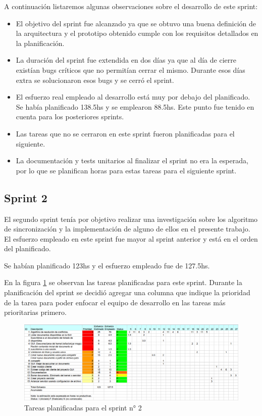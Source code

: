 \documentclass[12pt,a4paper]{article}
\begin{document}
A continuación listaremos algunas observaciones sobre el desarrollo de este sprint:

\begin{itemize}
\item El objetivo del sprint fue alcanzado ya que se obtuvo una buena definición de la arquitectura y el prototipo
obtenido cumple con los requisitos detallados en la planificación.
\item La duración del sprint fue extendida en dos días ya que al día de cierre existían bugs críticos que no permitían
cerrar el mismo. Durante esos días extra se solucionaron esos bugs y se cerró el sprint.
\item El esfuerzo real empleado al desarrollo está muy por debajo del planificado. Se había planificado 138.5hs y se
emplearon 88.5hs. Este punto fue tenido en cuenta para los posteriores sprints.
\item Las tareas que no se cerraron en este sprint fueron planificadas para el siguiente.
\item La documentación y tests unitarios al finalizar el sprint no era la esperada, por lo que se planifican
horas para estas tareas para el siguiente sprint.
\end{itemize}

\subsection{Sprint 2}

El segundo sprint tenía por objetivo realizar una investigación sobre los algoritmo de sincronización y la implementación
de alguno de ellos en el presente trabajo. El esfuerzo empleado en este sprint fue mayor al sprint anterior y está
en el orden del planificado.

Se habían planificado 123hs y el esfuerzo empleado fue de 127.5hs.

En la figura \ref{sprint2-tareas} se observan las tareas planificadas para este sprint. Durante la planificación del
sprint se decidió agregar una columna que indique la prioridad de la tarea para poder enfocar el equipo de desarrollo
en las tareas más prioritarias primero.

	\begin{figure}[!ht]
		\begin{center}
			\includegraphics[width=14cm]{sprint2.png}
			\caption{\label{sprint2-tareas} Tareas planificadas para el sprint n° 2 }
		\end{center}
	\end{figure}
\end{document}
